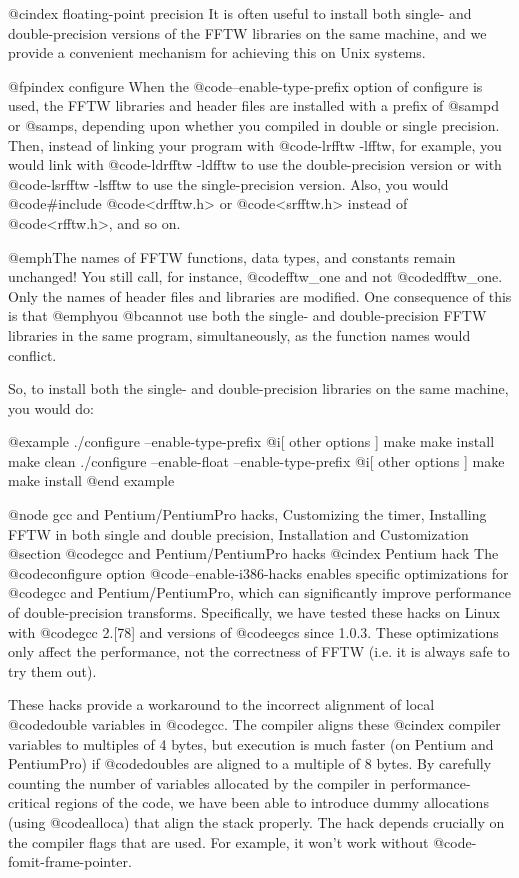 @cindex floating-point precision
It is often useful to install both single- and double-precision versions
of the FFTW libraries on the same machine, and we provide a convenient
mechanism for achieving this on Unix systems.

@fpindex configure
When the @code{--enable-type-prefix} option of configure is used, the
FFTW libraries and header files are installed with a prefix of @samp{d}
or @samp{s}, depending upon whether you compiled in double or single
precision.  Then, instead of linking your program with @code{-lrfftw
-lfftw}, for example, you would link with @code{-ldrfftw -ldfftw} to use
the double-precision version or with @code{-lsrfftw -lsfftw} to use the
single-precision version.  Also, you would @code{#include}
@code{<drfftw.h>} or @code{<srfftw.h>} instead of @code{<rfftw.h>}, and
so on.

@emph{The names of FFTW functions, data types, and constants remain
unchanged!}  You still call, for instance, @code{fftw_one} and not
@code{dfftw_one}.  Only the names of header files and libraries are
modified.  One consequence of this is that @emph{you @b{cannot} use both
the single- and double-precision FFTW libraries in the same program,
simultaneously,} as the function names would conflict.

So, to install both the single- and double-precision libraries on the
same machine, you would do:

@example
./configure --enable-type-prefix @i{[ other options ]}
make
make install
make clean
./configure --enable-float --enable-type-prefix @i{[ other options ]}
make
make install
@end example

@node gcc and Pentium/PentiumPro hacks, Customizing the timer, Installing FFTW in both single and double precision, Installation and Customization
@section @code{gcc} and Pentium/PentiumPro hacks
@cindex Pentium hack
The @code{configure} option @code{--enable-i386-hacks} enables specific
optimizations for @code{gcc} and Pentium/PentiumPro, which can
significantly improve performance of double-precision transforms.
Specifically, we have tested these hacks on Linux with @code{gcc}
2.[78] and versions of @code{egcs} since 1.0.3.  These optimizations
only affect the performance, not the correctness of FFTW (i.e. it is
always safe to try them out).

These hacks provide a workaround to the incorrect alignment of local
@code{double} variables in @code{gcc}.  The compiler aligns these
@cindex compiler
variables to multiples of 4 bytes, but execution is much faster (on
Pentium and PentiumPro) if @code{double}s are aligned to a multiple of 8
bytes.  By carefully counting the number of variables allocated by the
compiler in performance-critical regions of the code, we have been able
to introduce dummy allocations (using @code{alloca}) that align the
stack properly.  The hack depends crucially on the compiler flags that
are used.  For example, it won't work without
@code{-fomit-frame-pointer}.

